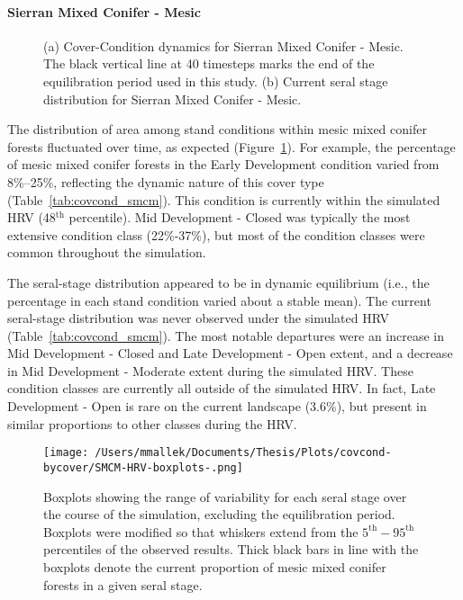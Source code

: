 \paragraph{Sierran Mixed Conifer - Mesic}

\begin{figure}[!htbp]
  \centering
  \caption{(a) Cover-Condition dynamics for Sierran Mixed Conifer - Mesic. The black vertical line at 40 timesteps marks the end of the equilibration period used in this study. (b) Current seral stage distribution for Sierran Mixed Conifer - Mesic.} 
  \label{fig:covcond_smcm}
\end{figure}

The distribution of area among stand conditions within mesic mixed conifer forests fluctuated over time, as expected (Figure~\ref{fig:covcond_smcm}). For example, the percentage of mesic mixed conifer forests in the Early Development condition varied from 8\%--25\%, reflecting the dynamic nature of this cover type (Table~\ref{tab:covcond_smcm}). This condition is currently within the simulated HRV (48$^{\text{th}}$ percentile). Mid Development - Closed was typically the most extensive condition class (22\%-37\%), but most of the condition classes were common throughout the simulation. %

The seral-stage distribution appeared to be in dynamic equilibrium (i.e., the percentage in each stand condition varied about a stable mean). The current seral-stage distribution was never observed under the simulated HRV (Table~\ref{tab:covcond_smcm}). The most notable departures were an increase in Mid Development - Closed and Late Development - Open extent, and a decrease in Mid Development - Moderate extent during the simulated HRV. These condition classes are currently all outside of the simulated HRV. In fact, Late Development - Open is rare on the current landscape (3.6\%), but present in similar proportions to  other classes during the HRV. 



\begin{figure}[!htbp]
  \centering
    \texttt{[image: /Users/mmallek/Documents/Thesis/Plots/covcond-bycover/SMCM-HRV-boxplots-.png]}
  \caption{Boxplots showing the range of variability for each seral stage over the course of the simulation, excluding the equilibration period. Boxplots were modified so that whiskers extend from the $5^{\text{th}} - 95^{\text{th}}$ percentiles of the observed results. Thick black bars in line with the boxplots denote the current proportion of mesic mixed conifer forests in a given seral stage.} 
  \label{fig:covcond_smcm_boxplots}
\end{figure}

